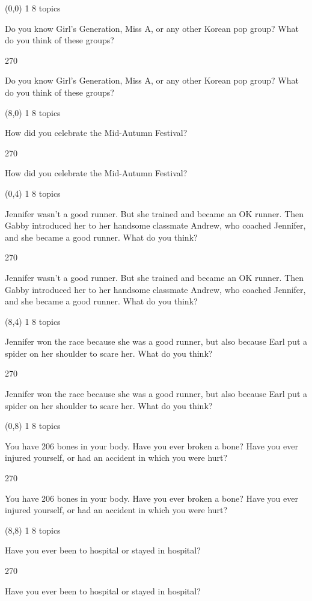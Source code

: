 \documentclass[a4paper]{article}
\newenvironment{itemize*}%
{\begin{itemize}%
 \setlength{\itemsep}{0.5cm}%
 \setlength{\parsep}{0pt}%
 \setlength{\parskip}{0pt}}%
{\end{itemize}}
\newcommand{\mycard}[3]{%
	\small #1 #2
	\par
	\parbox[t][6.8cm][c]{9.5cm}{%
	\par
	\myleft{#3}
	\par
	\myright{#3}
	}
}
\newcommand{\myleft}[1]{%
	\begin{sideways}
	\hspace*{-0.9cm}
		\parbox[t][2.7cm][t]{6.5cm}{%
		\large #1
		}
	\end{sideways}
}
\newcommand{\myright}[1]{%
	\hspace*{6.5cm}
	\begin{turn}{270}
	\hspace*{-7.1cm}
		\parbox[t][2.7cm][t]{6.5cm}{%
		\large #1
		}
	\end{turn}
}
\begin{document}
\begin{textblock}{8}(0,0)
\mycard{1}{8 topics}{
\begin{itemize*}
\item Do you know Girl's Generation, Miss A, or any other Korean pop group? What do you think of these groups?
\end{itemize*}
}
\end{textblock}

\begin{textblock}{8}(8,0)
\mycard{1}{8 topics}{
\begin{itemize*}
\item How did you celebrate the Mid-Autumn Festival?
\end{itemize*}
}
\end{textblock}

\begin{textblock}{8}(0,4)
\mycard{1}{8 topics}{
\begin{itemize*}
\item Jennifer wasn't a good runner. But she trained and became an OK runner. Then Gabby introduced her to her handsome classmate Andrew, who coached Jennifer, and she became a good runner. What do you think?
\end{itemize*}
}
\end{textblock}

\begin{textblock}{8}(8,4)
\mycard{1}{8 topics}{
\begin{itemize*}
\item Jennifer won the race because she was a good runner, but also because Earl put a spider on her shoulder to scare her. What do you think?
\end{itemize*}
}
\end{textblock}

\begin{textblock}{8}(0,8)
\mycard{1}{8 topics}{
\begin{itemize*}
\item You have 206 bones in your body. Have you ever broken a bone? Have you ever injured yourself, or had an accident in which you were hurt?
\end{itemize*}
}
\end{textblock}

\begin{textblock}{8}(8,8)
\mycard{1}{8 topics}{
\begin{itemize*}
\item Have you ever been to hospital or stayed in hospital?
\end{itemize*}
}
\end{textblock}
\end{document}
